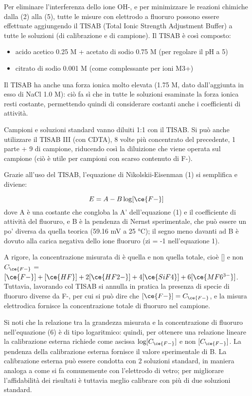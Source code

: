 Per eliminare l'interferenza dello ione OH-, e per minimizzare le reazioni chimiche dalla (2) alla (5), tutte le misure con elettrodo a fluoruro possono essere effettuate aggiungendo il TISAB (Total Ionic Strength Adjustment Buffer) a tutte le soluzioni (di calibrazione e di campione). Il TISAB è così composto:
\begin{itemize}
\item acido acetico 0.25 M + acetato di sodio 0.75 M (per regolare il pH a 5)
\item citrato di sodio 0.001 M (come complessante per ioni M3+)
\end{itemize}

Il TISAB ha anche una forza ionica molto elevata (1.75 M, dato dall'aggiunta in esso di NaCl 1.0 M): ciò fa sì che in tutte le soluzioni esaminate la forza ionica resti costante, permettendo quindi di considerare costanti anche i coefficienti di attività.

Campioni e soluzioni standard vanno diluiti 1:1 con il TISAB. Si può anche utilizzare il TISAB III (con CDTA), 8 volte più concentrato del precedente, 1 parte + 9 di campione, riducendo così la diluizione che viene operata sul campione (ciò è utile per campioni con scarso contenuto di F-).

Grazie all'uso del TISAB, l'equazione di Nikolskii-Eisenman (1) si semplifica e diviene:

\begin{equation} \label{eq:laboratorio:6}
E = A - B\log [\ce{F-}]
\end{equation}
dove A è una costante che congloba la A' dell'equazione (1) e il coefficiente di attività del fluoruro, e B è la pendenza di Nernst sperimentale, che può essere un po' diversa da quella teorica (59.16 mV a 25 °C); il segno meno davanti ad B è dovuto alla carica negativa dello ione fluoruro (zi = -1 nell'equazione 1).

A rigore, la concentrazione misurata di  è quella  e non quella totale, cioè [] e non $C_{\ce{F-}}$ = $[\ce{F-}] + [\ce{HF}] + 2[\ce{HF2-}] + 4[\ce{SiF4}] + 6[\ce{MF6^{3-}}]$. Tuttavia, lavorando col TISAB si annulla in pratica la presenza di specie di fluoruro diverse da F-, per cui si può dire che $[\ce{F-}] = C_{\ce{F-}}$, e la misura elettrodica fornisce la concentrazione totale di fluoruro nel campione.

Si noti che la relazione tra la grandezza misurata e la concentrazione di fluoruro nell'equazione (6) è di tipo logaritmico: quindi, per ottenere una relazione lineare la calibrazione esterna richiede come ascissa $\log [C_{\ce{F-}}]$ e non $[C_{\ce{F-}}]$. La pendenza della calibrazione esterna fornisce il valore sperimentale di B. La calibrazione esterna può essere condotta con 2 soluzioni standard, in maniera analoga a come si fa comunemente con l'elettrodo di vetro; per migliorare l'affidabilità dei risultati è tuttavia meglio calibrare con più di due soluzioni standard.

